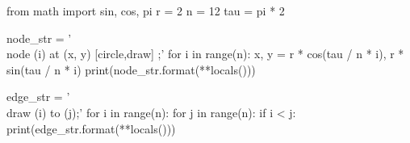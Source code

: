 \begin{python}
from math import sin, cos, pi
r = 2
n = 12
tau = pi * 2

node_str = '\\node ({i}) at ({x}, {y}) [circle,draw] {{}};\n'
for i in range(n):
    x, y = r * cos(tau / n * i), r * sin(tau / n * i)
    print(node_str.format(**locals()))

edge_str = '\\draw ({i}) to ({j});\n'
for i in range(n):
    for j in range(n):
        if i < j:
            print(edge_str.format(**locals()))

\end{python}

